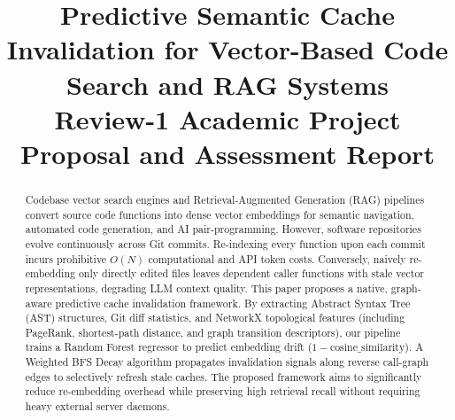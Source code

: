 \documentclass[conference]{IEEEtran}
\begin{document}
\title{Predictive Semantic Cache Invalidation for Vector-Based Code Search and RAG Systems\\
\large Review-1 Academic Project Proposal and Assessment Report
}

\author{
    \and
}

\maketitle

\begin{abstract}
Codebase vector search engines and Retrieval-Augmented Generation (RAG) pipelines convert source code functions into dense vector embeddings for semantic navigation, automated code generation, and AI pair-programming. However, software repositories evolve continuously across Git commits. Re-indexing every function upon each commit incurs prohibitive $O(N)$ computational and API token costs. Conversely, naively re-embedding only directly edited files leaves dependent caller functions with stale vector representations, degrading LLM context quality. This paper proposes a native, graph-aware predictive cache invalidation framework. By extracting Abstract Syntax Tree (AST) structures, Git diff statistics, and NetworkX topological features (including PageRank, shortest-path distance, and graph transition descriptors), our pipeline trains a Random Forest regressor to predict embedding drift ($1 - \text{cosine\_similarity}$). A Weighted BFS Decay algorithm propagates invalidation signals along reverse call-graph edges to selectively refresh stale caches. The proposed framework aims to significantly reduce re-embedding overhead while preserving high retrieval recall without requiring heavy external server daemons.
\end{abstract}
\end{document}
